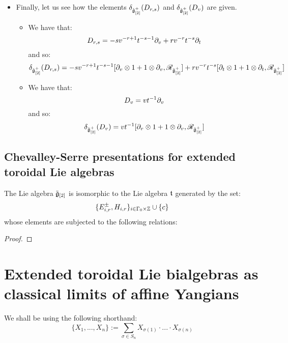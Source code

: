 \begin{remark}
\begin{itemize}
                    \item Finally, let us see how the elements $\delta_{\hat{\mathfrak{g}}_{[2]}^+}(D_{r, s})$ and $\delta_{\hat{\mathfrak{g}}_{[2]}^+}(D_v)$ are given.
                    \begin{itemize}
                        \item We have that:
                            $$D_{r, s} = -s v^{-r + 1} t^{-s - 1} \partial_v + r v^{-r} t^{-s} \partial_t$$
                        and so:
                            $$\delta_{\hat{\g}_{[2]}^+}(D_{r, s}) = -s v^{-r + 1} t^{-s - 1} [\del_v \tensor 1 + 1 \tensor \del_v, \scrR_{\hat{\g}_{[2]}^+}] + r v^{-r} t^{-s} [\del_t \tensor 1 + 1 \tensor \del_t, \scrR_{\hat{\g}_{[2]}^+}]$$
                        \item We have that:
                            $$D_v = v t^{-1} \partial_v$$
                        and so:
                            $$\delta_{\hat{\g}_{[2]}^+}(D_v) = v t^{-1} [\del_v \tensor 1 + 1 \tensor \del_v, \scrR_{\hat{\g}_{[2]}^+}]$$
                    \end{itemize}
                \end{itemize}
            \end{remark}

        \subsection{Chevalley-Serre presentations for extended toroidal Lie algebras}
            \begin{lemma} \label{lemma: chevalley_serre_presentation_for_central_extensions_of_multiloop_algebras}
                The Lie algebra $\tilde{\mathfrak{g}}_{[2]}$ is isomorphic to the Lie algebra $\mathfrak{t}$ generated by the set:
                    $$\{ E_{i, r}^{\pm}, H_{i, r} \}_{i \in \Gamma_0 \x \Z} \cup \{ c \}$$
                whose elements are subjected to the following relations:
                    
            \end{lemma}
                \begin{proof}
                    
                \end{proof}

    \section{Extended toroidal Lie bialgebras as classical limits of affine Yangians}
        \begin{convention}
            We shall be using the following shorthand:
                $$\{ X_1, ..., X_n \} := \sum_{\sigma \in S_n} X_{\sigma(1)} \cdot ... \cdot X_{\sigma(n)}$$
        \end{convention}
    

